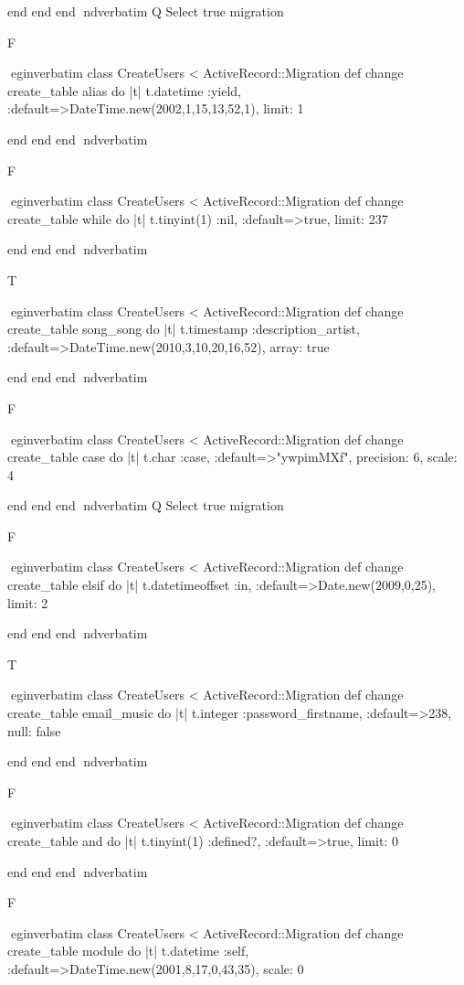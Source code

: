     end 
  end 
end
nd{verbatim}
Q
 Select true migration

F

egin{verbatim}
 class CreateUsers < ActiveRecord::Migration 
  def change 
    create_table alias do |t| 
      t.datetime :yield, :default=>DateTime.new(2002,1,15,13,52,1), limit: 1
    
    end 
  end 
end
nd{verbatim}

F

egin{verbatim}
 class CreateUsers < ActiveRecord::Migration 
  def change 
    create_table while do |t| 
      t.tinyint(1) :nil, :default=>true, limit: 237
    
    end 
  end 
end
nd{verbatim}

T

egin{verbatim}
 class CreateUsers < ActiveRecord::Migration 
  def change 
    create_table song_song do |t| 
      t.timestamp :description_artist, :default=>DateTime.new(2010,3,10,20,16,52), array: true
    
    end 
  end 
end
nd{verbatim}

F

egin{verbatim}
 class CreateUsers < ActiveRecord::Migration 
  def change 
    create_table case do |t| 
      t.char :case, :default=>"ywpimMXf", precision: 6, scale: 4
    
    end 
  end 
end
nd{verbatim}
Q
 Select true migration

F

egin{verbatim}
 class CreateUsers < ActiveRecord::Migration 
  def change 
    create_table elsif do |t| 
      t.datetimeoffset :in, :default=>Date.new(2009,0,25), limit: 2
    
    end 
  end 
end
nd{verbatim}

T

egin{verbatim}
 class CreateUsers < ActiveRecord::Migration 
  def change 
    create_table email_music do |t| 
      t.integer :password_firstname, :default=>238, null: false
    
    end 
  end 
end
nd{verbatim}

F

egin{verbatim}
 class CreateUsers < ActiveRecord::Migration 
  def change 
    create_table and do |t| 
      t.tinyint(1) :defined?, :default=>true, limit: 0
    
    end 
  end 
end
nd{verbatim}

F

egin{verbatim}
 class CreateUsers < ActiveRecord::Migration 
  def change 
    create_table module do |t| 
      t.datetime :self, :default=>DateTime.new(2001,8,17,0,43,35), scale: 0
    
